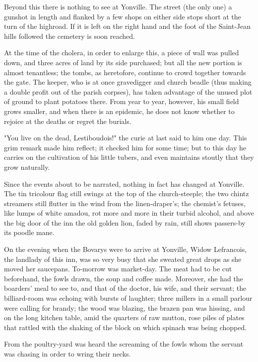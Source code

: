 \documentclass[11pt,twocolumn]{ltugboat}
\begin{document}
Beyond this there is nothing to see at Yonville. The street (the only
one) a gunshot in length and flanked by a few shops on either side stops
short at the turn of the highroad. If it is left on the right hand and
the foot of the Saint-Jean hills followed the cemetery is soon reached.

At the time of the cholera, in order to enlarge this, a piece of wall
was pulled down, and three acres of land by its side purchased; but all
the new portion is almost tenantless; the tombs, as heretofore,
continue to crowd together towards the gate. The keeper, who is at once
gravedigger and church beadle (thus making a double profit out of the
parish corpses), has taken advantage of the unused plot of ground to
plant potatoes there. From year to year, however, his small field grows
smaller, and when there is an epidemic, he does not know whether to
rejoice at the deaths or regret the burials.

"You live on the dead, Lestiboudois!" the curie at last said to him one
day. This grim remark made him reflect; it checked him for some time;
but to this day he carries on the cultivation of his little tubers, and
even maintains stoutly that they grow naturally.

Since the events about to be narrated, nothing in fact has changed
at Yonville. The tin tricolour flag still swings at the top of the
church-steeple; the two chintz streamers still flutter in the wind from
the linen-draper's; the chemist's fetuses, like lumps of white amadou,
rot more and more in their turbid alcohol, and above the big door of
the inn the old golden lion, faded by rain, still shows passers-by its
poodle mane.

On the evening when the Bovarys were to arrive at Yonville, Widow
Lefrancois, the landlady of this inn, was so very busy that she sweated
great drops as she moved her saucepans. To-morrow was market-day. The
meat had to be cut beforehand, the fowls drawn, the soup and coffee
made. Moreover, she had the boarders' meal to see to, and that of the
doctor, his wife, and their servant; the billiard-room was echoing with
bursts of laughter; three millers in a small parlour were calling for
brandy; the wood was blazing, the brazen pan was hissing, and on the
long kitchen table, amid the quarters of raw mutton, rose piles of
plates that rattled with the shaking of the block on which spinach was
being chopped.

From the poultry-yard was heard the screaming of the fowls whom the
servant was chasing in order to wring their necks.
\end{document}
